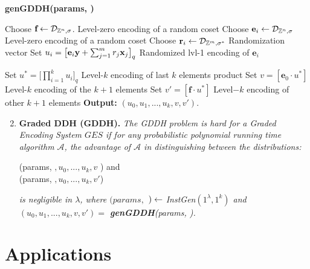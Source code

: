 \begin{tcolorbox}[colframe=black,colback=white,arc=0pt,outer arc=0pt]
	\begin{center}
		\textbf{genGDDH(params, \pzt)}
	\end{center}
	\begin{algorithmic}[1]
		\State Choose $\textbf{f} \leftarrow \mathcal{D}_{{\mathbb Z}^n, \sigma}$. \Comment Level-zero encoding of a random coset
		\State Choose $\textbf{e}_i \leftarrow \mathcal{D}_{{\mathbb Z}^n, \sigma}$ \Comment Level-zero encoding of a random coset
		\State Choose $\textbf{r}_i \leftarrow \mathcal{D}_{{\mathbb Z}^m, \sigma^*}$ \Comment Randomization vector
		\State Set $u_i = \big[\textbf{e}_i\textbf{y} + \sum_{j=1}^{m} r_j \textbf{x}_j \big]_q$ \Comment Randomized lvl-1 encoding of $\textbf{e}_i$
		\EndFor
		
		\State Set $u^* = \big[ \prod_{i = 1}^{k} u_ i\big] _q$  \Comment Level-$k$ encoding of last $k$ elements product
		\State Set $v = [\textbf{e}_0 \cdot u^*]$ \Comment Level-$k$ encoding of the $k+1$ elements
		\State Set $v' = [\textbf{f} \cdot u^*]$ \Comment Level$-k$ encoding of other $k+1$ elements
		\State \textbf{Output:} $(u_0, u_1, ..., u_k, v, v')$.
	\end{algorithmic}
\end{tcolorbox}

	
	\begin{enumerate}
	 \setcounter{enumi}{1}

	\item \textbf{Graded DDH (GDDH). } \textit{The GDDH problem is hard for a Graded Encoding System $GES$ if for any probabilistic polynomial running time algorithm $\mathcal{A}$, the advantage of $\mathcal{A}$ in distinguishing between the distributions:}
	
	\begin{center}
		(params, {\pzt}$, u_0, ... ,u_k, v$ ) and \\
		(params, {\pzt}$, u_0, ... ,u_k, v'$)
	\end{center}
	\textit{is negligible in $\lambda$, where $(params, $ {\pzt} $)\leftarrow$ InstGen$(1^\lambda, 1^k)$ and $(u_0, u_1, ..., u_k, v, v') =$ \textbf{genGDDH}(params, \pzt).}
\end{enumerate} 

\section{Applications}





